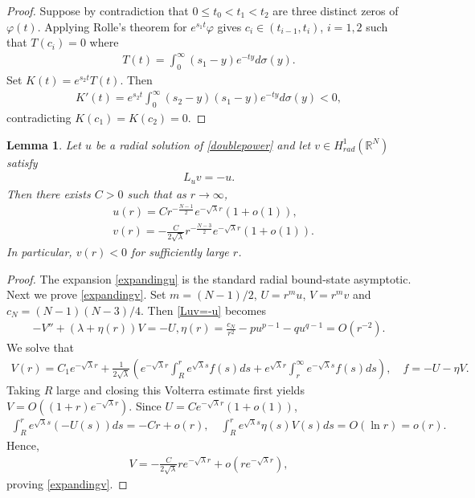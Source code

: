\documentclass{article}
\newtheorem{lemma}[theorem]{Lemma}
\theoremstyle{definition} \theoremstyle{remark}
\numberwithin{equation}{section}
\newcommand{\R}{\mathbb{R}}
\newcommand{\la}{\lambda}
\begin{document}
	\begin{proof}
		Suppose by contradiction that $0 \le t_0 < t_1 < t_2$ are three distinct zeros of $\varphi(t)$. Applying Rolle's theorem for $e^{s_1t}\varphi$ gives $c_i \in (t_{i-1},t_i)$, $i = 1,2$ such that $T(c_i) = 0$ where
		\begin{align*}
			T(t) = \int_0^\infty (s_1-y)e^{-ty}d\sigma(y).
		\end{align*}
		Set $K(t) = e^{s_2t}T(t)$. Then
		\begin{align*}
			K'(t) = e^{s_2t} \int_0^\infty (s_2-y)(s_1-y)e^{-ty}d\sigma(y) < 0,
		\end{align*}
		contradicting $K(c_1) = K(c_2) = 0$.
	\end{proof}
	
	\begin{lemma} \label{asymptoticlemma}
		Let $u$ be a radial solution of \eqref{doublepower} and let $v \in H_{rad}^1(\R^N)$ satisfy
		\begin{align} \label{Luv=-u}
			L_u v = -u.
		\end{align}
		Then there exists $C > 0$ such that as $r \to \infty$,
		\begin{align}
			& u(r) = C r^{-\frac{N-1}{2}}e^{-\sqrt{\la}r}\left(1 + o(1)\right), \label{expandingu}\\
			& v(r) = -\frac{C}{2\sqrt{\la}}r^{-\frac{N-3}{2}}e^{-\sqrt{\la}r}\left(1 + o(1)\right). \label{expandingv}
		\end{align}
		In particular, $v(r) < 0$ for sufficiently large $r$.
	\end{lemma}

	\begin{proof}
		The expansion \eqref{expandingu} is the standard radial bound-state asymptotic. Next we prove \eqref{expandingv}. Set $m = (N-1)/2$, $U = r^m u$, $V = r^m v$ and $c_N = (N-1)(N-3)/4$. Then \eqref{Luv=-u} becomes
		\begin{align*}
			-V'' + \left(\la + \eta(r)\right)V = -U, \eta(r) = \frac{c_N}{r^2} - pu^{p-1} - qu^{q-1} = O(r^{-2}).
		\end{align*}
		We solve that
		\begin{align*}
			V(r) = C_1e^{-\sqrt{\la}r} + \frac{1}{2\sqrt{\la}}\left(e^{-\sqrt{\la}r}\int_R^r e^{\sqrt{\la}s}f(s)ds + e^{\sqrt{\la}r}\int_r^\infty e^{-\sqrt{\la}s}f(s)ds\right), \quad f = -U - \eta V.
		\end{align*}
		Taking $R$ large and closing this Volterra estimate first yields $V = O\left((1+r)e^{-\sqrt{\la}r}\right)$. Since $U = Ce^{-\sqrt{\la}r}\left(1 + o(1)\right)$,
		\begin{align*}
			\int_R^r e^{\sqrt{\la}s}(-U(s))ds = -Cr + o(r), \quad \int_R^r e^{\sqrt{\la}s}\eta(s)V(s)ds = O(\ln r) = o(r).
		\end{align*}
		Hence,
		\begin{align*}
			V= -\frac{C}{2\sqrt{\la}}re^{-\sqrt{\la}r} + o(re^{-\sqrt{\la}r}),
		\end{align*}
		proving \eqref{expandingv}.
	\end{proof}
\end{document}
